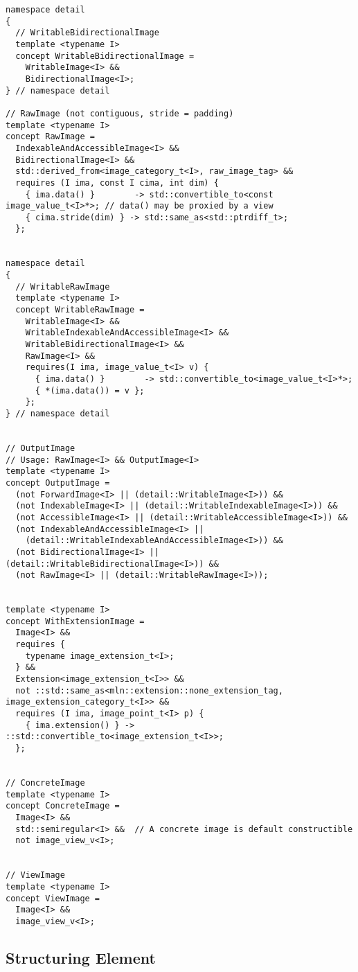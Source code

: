 \begin{verbatim}
namespace detail
{
  // WritableBidirectionalImage
  template <typename I>
  concept WritableBidirectionalImage =
    WritableImage<I> &&
    BidirectionalImage<I>;
} // namespace detail

// RawImage (not contiguous, stride = padding)
template <typename I>
concept RawImage =
  IndexableAndAccessibleImage<I> &&
  BidirectionalImage<I> &&
  std::derived_from<image_category_t<I>, raw_image_tag> &&
  requires (I ima, const I cima, int dim) {
    { ima.data() }        -> std::convertible_to<const image_value_t<I>*>; // data() may be proxied by a view
    { cima.stride(dim) } -> std::same_as<std::ptrdiff_t>;
  };


namespace detail
{
  // WritableRawImage
  template <typename I>
  concept WritableRawImage =
    WritableImage<I> &&
    WritableIndexableAndAccessibleImage<I> &&
    WritableBidirectionalImage<I> &&
    RawImage<I> &&
    requires(I ima, image_value_t<I> v) {
      { ima.data() }        -> std::convertible_to<image_value_t<I>*>;
      { *(ima.data()) = v };
    };
} // namespace detail


// OutputImage
// Usage: RawImage<I> && OutputImage<I>
template <typename I>
concept OutputImage =
  (not ForwardImage<I> || (detail::WritableImage<I>)) &&
  (not IndexableImage<I> || (detail::WritableIndexableImage<I>)) &&
  (not AccessibleImage<I> || (detail::WritableAccessibleImage<I>)) &&
  (not IndexableAndAccessibleImage<I> ||
    (detail::WritableIndexableAndAccessibleImage<I>)) &&
  (not BidirectionalImage<I> || (detail::WritableBidirectionalImage<I>)) &&
  (not RawImage<I> || (detail::WritableRawImage<I>));


template <typename I>
concept WithExtensionImage =
  Image<I> &&
  requires {
    typename image_extension_t<I>;
  } &&
  Extension<image_extension_t<I>> &&
  not ::std::same_as<mln::extension::none_extension_tag, image_extension_category_t<I>> &&
  requires (I ima, image_point_t<I> p) {
    { ima.extension() } -> ::std::convertible_to<image_extension_t<I>>;
  };


// ConcreteImage
template <typename I>
concept ConcreteImage =
  Image<I> &&
  std::semiregular<I> &&  // A concrete image is default constructible
  not image_view_v<I>;


// ViewImage
template <typename I>
concept ViewImage =
  Image<I> &&
  image_view_v<I>;
\end{verbatim}


\subsection{Structuring Element}

